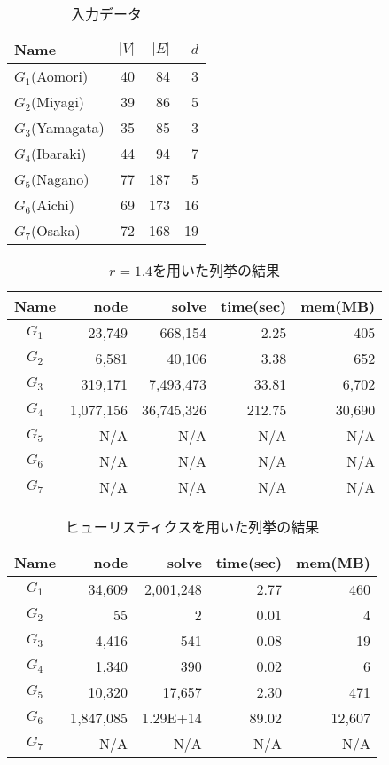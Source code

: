 \documentclass[a4j,12pt]{jreport}
\begin{document}
\begin{table}[htbp]
  \small
  \caption{入力データ}
  \label{table:input}
  \centering
  \begin{tabular}{l|rrr}
    \hline
    Name & $|V|$ & $|E|$ & $d$ \\
    \hline\hline
    $G_1$(Aomori) & 40 & 84 & 3 \\
    $G_2$(Miyagi) & 39 & 86 & 5 \\
    $G_3$(Yamagata) & 35 & 85 & 3 \\
    $G_4$(Ibaraki) & 44 & 94 & 7 \\
    $G_5$(Nagano) & 77 & 187 & 5 \\
    $G_6$(Aichi) & 69 & 173 & 16 \\
    $G_7$(Osaka) & 72 & 168 & 19 \\
    \hline
  \end{tabular}
\end{table}

\begin{table}[htbp]
  \small
  \caption{$r=1.4$を用いた列挙の結果}
  \label{table:result_r}
  \centering
  \begin{tabular}{c|rrrr}
    \hline
    Name & node & solve & time(sec) & mem(MB) \\
    \hline \hline
    $G_1$ & 23{,}749 & 668{,}154 & 2.25 & 405 \\
    $G_2$ & 6{,}581 & 40{,}106 & 3.38 & 652 \\
    $G_3$ & 319{,}171 & 7{,}493{,}473 & 33.81 & 6{,}702 \\
    $G_4$ & 1{,}077{,}156 & 36{,}745{,}326 & 212.75 & 30{,}690 \\
    $G_5$ & N/A & N/A & N/A & N/A \\
    $G_6$ & N/A & N/A & N/A & N/A \\
    $G_7$ & N/A & N/A & N/A & N/A \\
    \hline
  \end{tabular}
\end{table}

\begin{table}[htbp]
  \small
  \caption{ヒューリスティクスを用いた列挙の結果}
  \label{table:answer_h}
  \centering
  \begin{tabular}{c|rrrr}
    \hline
    Name &  node & solve & time(sec) & mem(MB) \\
    \hline \hline
    $G_1$ & 34{,}609 & 2{,}001{,}248 & 2.77 & 460 \\
    $G_2$ & 55 & 2 & 0.01 & 4 \\
    $G_3$ & 4{,}416 & 541 & 0.08 & 19 \\
    $G_4$ & 1{,}340 & 390 & 0.02 & 6 \\
    $G_5$ & 10{,}320 & 17{,}657 & 2.30 & 471 \\
    $G_6$ & 1{,}847{,}085 & 1.29E+14 & 89.02 & 12{,}607 \\
    $G_7$ & N/A & N/A & N/A & N/A \\
    \hline
  \end{tabular}
\end{table}
\end{document}
